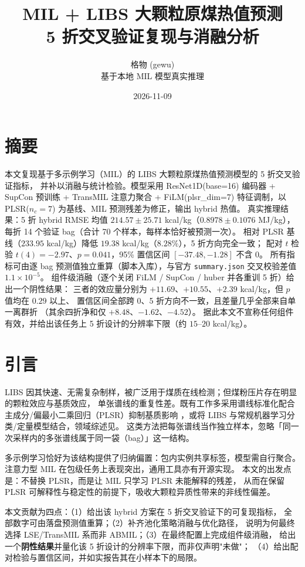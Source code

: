 \documentclass[11pt,a4paper,UTF8]{ctexart}
\title{MIL + LIBS 大颗粒原煤热值预测\\5 折交叉验证复现与消融分析}
\author{格物 (gewu)\\基于本地 MIL 模型真实推理}
\date{2026-11-09}
\begin{document}
\maketitle

\section*{摘要}
本文复现基于多示例学习（MIL）的 LIBS 大颗粒原煤热值预测模型的 5 折交叉验证指标，
并补以消融与统计检验。模型采用 ResNet1D(base=16) 编码器 + SupCon 预训练 + TransMIL 注意力聚合
+ FiLM(plsr\_dim=7) 特征调制，以 PLSR($n_c=7$) 为基线、MIL 预测残差为修正，输出 hybrid 热值。
真实推理结果：5 折 hybrid RMSE 均值 $214.57 \pm 25.71$ kcal/kg（$0.8978 \pm 0.1076$ MJ/kg），
每折 14 个验证 bag（合计 70 个样本，每样本恰好被预测一次）。
相对 PLSR 基线（$233.95$ kcal/kg）降低 $19.38$ kcal/kg（$8.28\%$），5 折方向完全一致；
配对 $t$ 检验 $t(4)=-2.97$、$p=0.041$，95\% 置信区间 $[-37.48,-1.28]$ 不含 0。
所有指标可由逐 bag 预测值独立重算（脚本入库），与官方 \texttt{summary.json} 交叉校验差值 $1.1\times10^{-5}$。
组件级消融（逐个关闭 FiLM / SupCon / huber 并各重训 5 折）给出一个阴性结果：
三者的效应量分别为 $+11.69$、$+10.55$、$+2.39$ kcal/kg，但 $p$ 值均在 $0.29$ 以上、
置信区间全部跨 $0$、5 折方向不一致，且差量几乎全部来自单一离群折
（其余四折净和仅 $+8.48$、$-1.62$、$-4.52$）。
据此本文不宣称任何组件有效，并给出该任务上 5 折设计的分辨率下限（约 $15$--$20$ kcal/kg）。

\section{引言}
LIBS 因其快速、无需复杂制样，被广泛用于煤质在线检测；但煤粉压片存在明显的颗粒效应与基质效应，
单张谱线的重复性差。既有工作多采用谱线标准化配合主成分/偏最小二乘回归（PLSR）抑制基质影响
\cite{p1,p2}，或将 LIBS 与常规机器学习分类/定量模型结合\cite{p4}，领域综述见\cite{p5}。
这类方法把每张谱线当作独立样本，忽略「同一次采样内的多张谱线属于同一袋（bag）」这一结构。

多示例学习恰好为该结构提供了归纳偏置：包内实例共享标签，模型需自行聚合。
注意力型 MIL 在包级任务上表现突出\cite{p6}，通用工具亦有开源实现\cite{p3}。
本文的出发点是：不替换 PLSR，而是让 MIL 只学习 PLSR 未能解释的残差，
从而在保留 PLSR 可解释性与稳定性的前提下，吸收大颗粒异质性带来的非线性偏差。

本文贡献为四点：（1）给出该 hybrid 方案在 5 折交叉验证下的可复现指标，
全部数字可由落盘预测值重算；（2）补齐池化策略消融与优化路径，
说明为何最终选择 LSE/TransMIL 系而非 ABMIL；（3）在最终配置上完成组件级消融，
给出一个\textbf{阴性结果}并量化该 5 折设计的分辨率下限，而非仅声明"未做"；
（4）给出配对检验与置信区间，并如实报告其在小样本下的局限。
\end{document}
